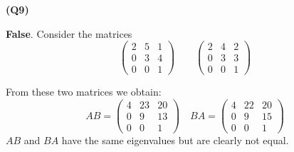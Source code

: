 \documentclass[12pt, a4paper]{article}
\begin{document}
\textbf{(Q9)}

\textbf{False}. Consider the matrices
\[
    \begin{pmatrix}
        2 & 5 & 1\\
        0 & 3 & 4\\
        0 & 0 & 1
    \end{pmatrix}\quad\quad
    \begin{pmatrix}
        2 & 4 & 2\\
        0 & 3 & 3\\
        0 & 0 & 1
    \end{pmatrix}
\]

From these two matrices we obtain:
\[
    AB = \begin{pmatrix}
        4 & 23 & 20\\
        0 & 9  & 13\\
        0 & 0  & 1 
    \end{pmatrix}\quad
    BA = \begin{pmatrix}
        4 & 22 & 20\\
        0 & 9  & 15\\
        0 & 0  & 1 
    \end{pmatrix}
\]
$AB$ and $BA$ have the same eigenvalues but are clearly not equal.
\end{document}
